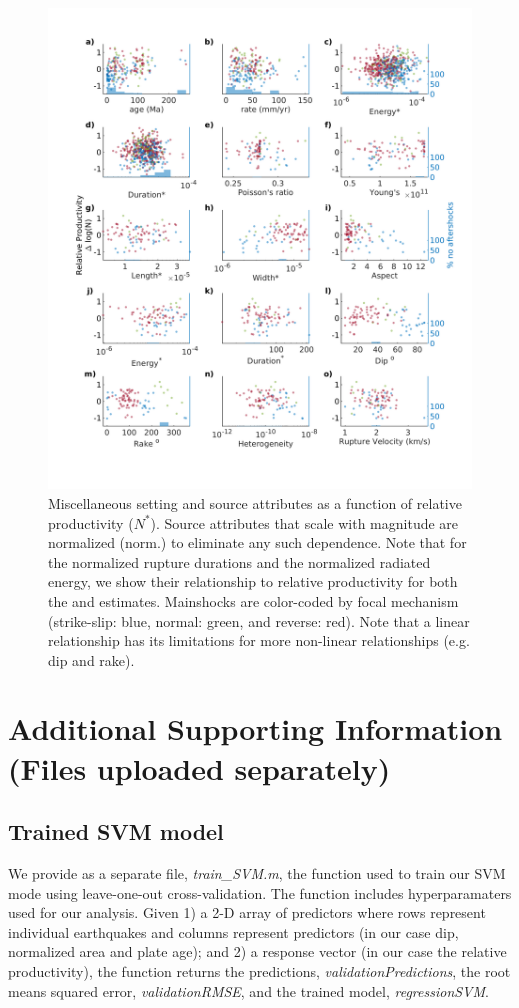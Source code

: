 \documentclass[draft]{agujournal}
\begin{document}
\begin{figure}[H]
\centering
\includegraphics{figures/misc.png}
\caption{Miscellaneous setting and source attributes as a function of relative productivity ($N^*$). Source attributes that scale with magnitude are normalized (norm.) to eliminate any such dependence. Note that for the normalized rupture durations and the normalized radiated energy, we show their relationship to relative productivity for both the \citet{Convers2011GlobalMid2010} and \citet{Hayes2017} estimates. Mainshocks are color-coded by focal mechanism (strike-slip: blue, normal: green, and reverse: red). Note that a linear relationship has its limitations for more non-linear relationships (e.g. dip and rake).}
\label{fig:misc}
\end{figure}   

\section{Additional Supporting Information (Files uploaded separately)}\label{sec:additional}
\subsection{Trained SVM model}\label{sec:trained}
We provide as a separate file, \textit{train\_SVM.m}, the function used to train our SVM mode using leave-one-out cross-validation. The function includes hyperparamaters used for our analysis. Given 1) a 2-D array of predictors where rows represent individual earthquakes and columns represent predictors (in our case dip, normalized area and plate age); and 2) a response vector (in our case the relative productivity), the function returns the predictions, \textit{validationPredictions}, the root means squared error, \textit{validationRMSE}, and the trained model, \textit{regressionSVM}.
\end{document}
